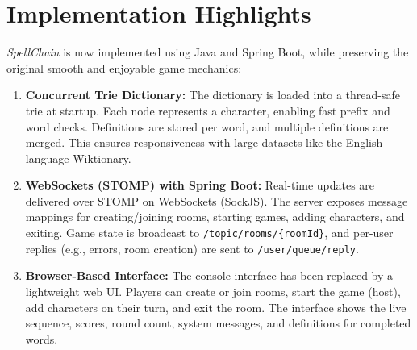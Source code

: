 \documentclass{article}
\begin{document}
\section*{Implementation Highlights}
\textit{SpellChain} is now implemented using Java and Spring Boot, while preserving the original smooth and enjoyable game mechanics:
\begin{enumerate}
    \item \textbf{Concurrent Trie Dictionary:} The dictionary is loaded into a thread-safe trie at startup. Each node represents a character, enabling fast prefix and word checks. Definitions are stored per word, and multiple definitions are merged. This ensures responsiveness with large datasets like the English-language Wiktionary.
    \item \textbf{WebSockets (STOMP) with Spring Boot:} Real-time updates are delivered over STOMP on WebSockets (SockJS). The server exposes message mappings for creating/joining rooms, starting games, adding characters, and exiting. Game state is broadcast to \texttt{/topic/rooms/\{roomId\}}, and per-user replies (e.g., errors, room creation) are sent to \texttt{/user/queue/reply}.
    \item \textbf{Browser-Based Interface:} The console interface has been replaced by a lightweight web UI. Players can create or join rooms, start the game (host), add characters on their turn, and exit the room. The interface shows the live sequence, scores, round count, system messages, and definitions for completed words.
\end{enumerate}
\end{document}
